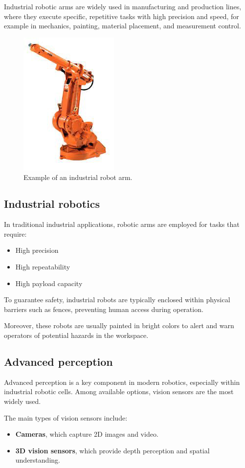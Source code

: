 Industrial robotic arms are widely used in manufacturing and production lines, where they execute specific, repetitive tasks with high precision and speed, for example in mechanics, painting, material placement, and measurement control.

\hfill
\begin{figure}[H]
  \centering
  \includegraphics[width=0.2\linewidth]{imgs/industrial_robot_arm.png}
  \caption{Example of an industrial robot arm.}
\end{figure}

\hfill

\subsection{Industrial robotics}

In traditional industrial applications, robotic arms are employed for tasks that require:
\begin{itemize}
  \item High precision
  \item High repeatability
  \item High payload capacity
\end{itemize}

To guarantee safety, industrial robots are typically enclosed within physical barriers such as fences, preventing human access during operation.

Moreover, these robots are usually painted in bright colors to alert and warn operators of potential hazards in the workspace.

\hfill

\subsection{Advanced perception}

Advanced perception is a key component in modern robotics, especially within industrial robotic cells. Among available options, vision sensors are the most widely used.

The main types of vision sensors include:
\begin{itemize}
  \item \textbf{Cameras}, which capture 2D images and video.
  \item \textbf{3D vision sensors}, which provide depth perception and spatial understanding.
\end{itemize}

